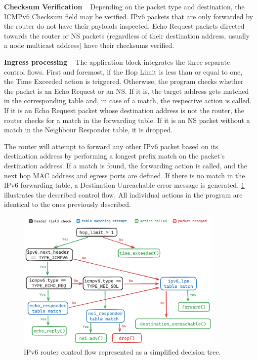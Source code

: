 \textbf{Checksum Verification} ~ Depending on the packet type and destination, the ICMPv6 Checksum field may be verified. IPv6 packets that are only forwarded by the router do not have their payloads inspected. Echo Request packets directed towards the router or NS packets (regardless of their destination address, usually a node multicast address) have their checksums verified.

\textbf{Ingress processing} ~ The application block integrates the three separate control flows. First and foremost, if the Hop Limit is less than or equal to one, the Time Exceeded action is triggered. Otherwise, the program checks whether the packet is an Echo Request or an NS. If it is, the target address gets matched in the corresponding table and, in case of a match, the respective action is called. If it is an Echo Request packet whose destination address is not the router, the router checks for a match in the forwarding table. If it is an NS packet without a match in the Neighbour Responder table, it is dropped.

The router will attempt to forward any other IPv6 packet based on its destination address by performing a longest prefix match on the packet's destination address. If a match is found, the forwarding action is called, and the next hop MAC address and egress ports are defined.  If there is no match in the IPv6 forwarding table, a Destination Unreachable error message is generated. \cref{fig:impl-router6apply} illustrates the described control flow. All individual actions in the program are identical to the ones previously described.

\begin{figure}[htbp]
  \centering
    \includegraphics[width=0.9\textwidth]{figures/implementation/router6_apply.jpg}
     \caption{IPv6 router control flow represented as a simplified decision tree.}
     \label{fig:impl-router6apply}
\end{figure}

